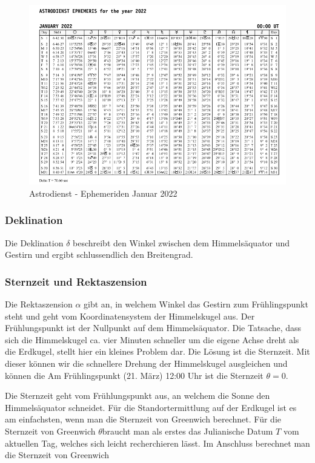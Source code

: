 \begin{figure}
	\begin{center}
		\includegraphics[width=18cm]{papers/nav/bilder/ephe.png}
		\caption[Astrodienst - Ephemeriden Januar 2022]{Astrodienst - Ephemeriden Januar 2022}
	\end{center}
\end{figure}

\subsubsection{Deklination}
Die Deklination $\delta$ beschreibt den Winkel zwischen dem Himmelsäquator und Gestirn und ergibt schlussendlich den Breitengrad.

\subsubsection{Sternzeit und Rektaszension}
Die Rektaszension $\alpha$ gibt an, in welchem Winkel das Gestirn zum Frühlingspunkt steht und geht vom Koordinatensystem der Himmelskugel aus.
Der Frühlungspunkt ist der Nullpunkt auf dem Himmelsäquator. 
Die Tatsache, dass sich die Himmelskugel  ca. vier Minuten schneller um die eigene Achse dreht als die Erdkugel, stellt hier ein kleines Problem dar.
Die Lösung ist die Sternzeit. 
Mit dieser können wir die schnellere Drehung der Himmelskugel ausgleichen und können die 
Am Frühlingspunkt (21. März) 12:00 Uhr ist die Sternzeit
$\theta = 0$. 

Die Sternzeit geht vom Frühlungspunkt aus, an welchem die Sonne den Himmelsäquator schneidet.
Für die Standortermittlung auf der Erdkugel ist es am einfachsten, wenn man die Sternzeit von Greenwich berechnet. 
Für die Sternzeit von Greenwich $\theta $braucht man als erstes das Julianische Datum $T$ vom aktuellen Tag, welches sich leicht recherchieren lässt.
Im Anschluss berechnet man die Sternzeit von Greenwich

